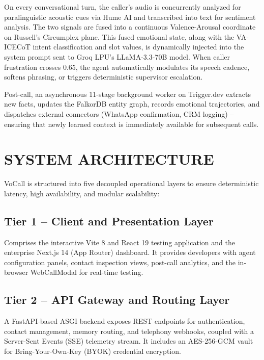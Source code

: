 \documentclass[12pt,a4paper]{article}
\begin{document}
On every conversational turn, the caller's audio is concurrently analyzed for paralinguistic acoustic cues via Hume AI and transcribed into text for sentiment analysis. The two signals are fused into a continuous Valence-Arousal coordinate on Russell's Circumplex plane. This fused emotional state, along with the VA-ICECoT intent classification and slot values, is dynamically injected into the system prompt sent to Groq LPU's LLaMA-3.3-70B model. When caller frustration crosses 0.65, the agent automatically modulates its speech cadence, softens phrasing, or triggers deterministic supervisor escalation.

Post-call, an asynchronous 11-stage background worker on Trigger.dev extracts new facts, updates the FalkorDB entity graph, records emotional trajectories, and dispatches external connectors (WhatsApp confirmation, CRM logging) -- ensuring that newly learned context is immediately available for subsequent calls.

\section{SYSTEM ARCHITECTURE}
VoCall is structured into five decoupled operational layers to ensure deterministic latency, high availability, and modular scalability:

\subsection{Tier 1 -- Client and Presentation Layer}
Comprises the interactive Vite 8 and React 19 testing application and the enterprise Next.js 14 (App Router) dashboard. It provides developers with agent configuration panels, contact inspection views, post-call analytics, and the in-browser WebCallModal for real-time testing.

\subsection{Tier 2 -- API Gateway and Routing Layer}
A FastAPI-based ASGI backend exposes REST endpoints for authentication, contact management, memory routing, and telephony webhooks, coupled with a Server-Sent Events (SSE) telemetry stream. It includes an AES-256-GCM vault for Bring-Your-Own-Key (BYOK) credential encryption.
\end{document}
